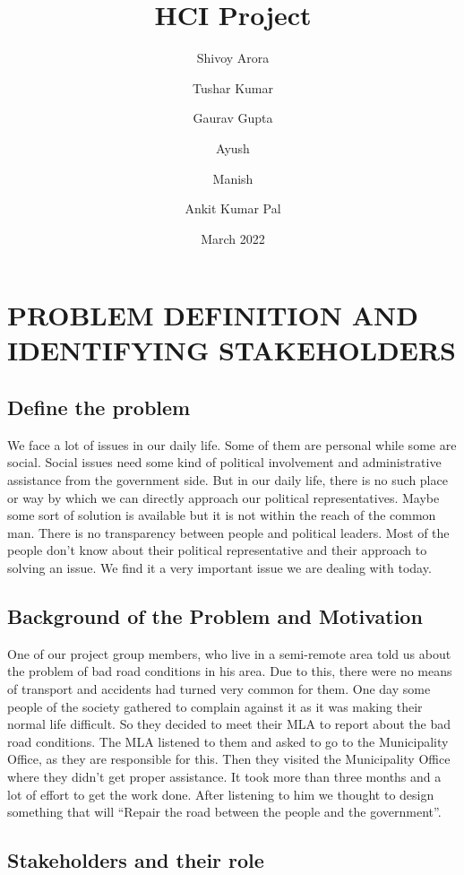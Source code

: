 \documentclass[manuscript,screen,review]{acmart}
\title{HCI Project}
\author{Shivoy Arora}
\author{Tushar Kumar}
\author{Gaurav Gupta}
\author{Ayush}
\author{Manish}
\author{Ankit Kumar Pal}
\date{March 2022}
\begin{document}
\maketitle

\section{PROBLEM DEFINITION AND IDENTIFYING STAKEHOLDERS}

\subsection{Define the problem}
We face a lot of issues in our daily life. Some of them are personal while some are social. Social issues need some kind of political involvement and administrative assistance from the government side. But in our daily life, there is no such place or way by which we can directly approach our political representatives. Maybe some sort of solution is available but it is not within the reach of the common man. There is no transparency between people and political leaders. Most of the people don’t know about their political representative and their approach to solving an issue. We find it a very important issue we are dealing with today.

\subsection{Background of the Problem and Motivation}
One of our project group members, who live in a semi-remote area told us about the problem of bad road conditions in his area. Due to this, there were no means of transport and accidents had turned very common for them. One day some people of the society gathered to complain against it as it was making their normal life difficult. So they decided to meet their MLA to report about the bad road conditions. The MLA listened to them and asked to go to the Municipality Office, as they are responsible for this. Then they visited the Municipality Office where they didn’t get proper assistance. It took more than three months and a lot of effort to get the work done. After listening to him we thought to design something that will “Repair the road between the people and the government”.

\subsection{Stakeholders and their role}
\end{document}
